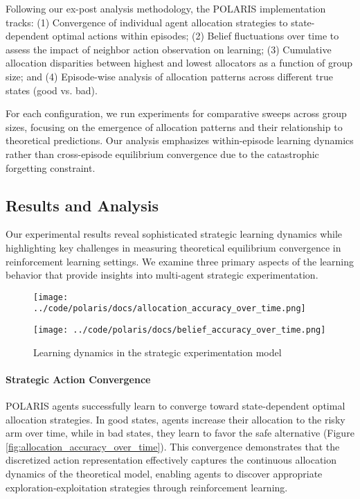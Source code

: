 Following our ex-post analysis methodology, the POLARIS implementation tracks: (1) Convergence of individual agent allocation strategies to state-dependent optimal actions within episodes; (2) Belief fluctuations over time to assess the impact of neighbor action observation on learning; (3) Cumulative allocation disparities between highest and lowest allocators as a function of group size; and (4) Episode-wise analysis of allocation patterns across different true states (good vs. bad).

For each configuration, we run experiments for comparative sweeps across group sizes, focusing on the emergence of allocation patterns and their relationship to theoretical predictions. Our analysis emphasizes within-episode learning dynamics rather than cross-episode equilibrium convergence due to the catastrophic forgetting constraint.

\subsection{Results and Analysis}

Our experimental results reveal sophisticated strategic learning dynamics while highlighting key challenges in measuring theoretical equilibrium convergence in reinforcement learning settings. We examine three primary aspects of the learning behavior that provide insights into multi-agent strategic experimentation.

\begin{figure}[!htbp]
    \centering
    \begin{minipage}[t]{0.48\textwidth}
        \centering
        \texttt{[image: ../code/polaris/docs/allocation\_accuracy\_over\_time.png]}
        \label{fig:allocation_accuracy_over_time}
    \end{minipage}
    \hfill
    \begin{minipage}[t]{0.48\textwidth}
        \centering
        \texttt{[image: ../code/polaris/docs/belief\_accuracy\_over\_time.png]}
        \label{fig:belief_accuracy_over_time}
    \end{minipage}
    \caption{Learning dynamics in the strategic experimentation model}
    \label{fig:strategic_experimentation_results}
\end{figure}

\paragraph{Strategic Action Convergence} POLARIS agents successfully learn to converge toward state-dependent optimal allocation strategies. In good states, agents increase their allocation to the risky arm over time, while in bad states, they learn to favor the safe alternative (Figure \ref{fig:allocation_accuracy_over_time}). This convergence demonstrates that the discretized action representation effectively captures the continuous allocation dynamics of the theoretical model, enabling agents to discover appropriate exploration-exploitation strategies through reinforcement learning.


